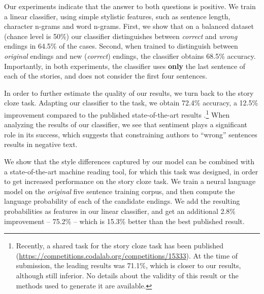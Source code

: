 \documentclass[11pt,a4paper]{article}
\newcommand{\com}[1]{}
\begin{document}
Our experiments indicate that the answer to both questions is positive. 
We train a linear classifier, using simple stylistic features, such as sentence length, character n-grams and word n-grams. 
First, we show that on a balanced dataset (chance level is 50\%) our classifier distinguishes between {\it correct} and {\it wrong} endings in 64.5\% of the cases. 
Second, when trained to distinguish between {\it original} endings and new ({\it correct}) endings, the classifier obtains 68.5\% accuracy. 
Importantly, in both experiments, the classifier uses {\bf only} the last sentence of each of the stories, and does not consider the first four sentences.


In order to further estimate the quality of our results, we turn back to the story cloze task.
Adapting our classifier to the task, we obtain 72.4\% accuracy, a 12.5\% improvement compared to the published state-of-the-art results \cite{Salle:2016}.\footnote{Recently, a shared task for the story cloze task has been published (\url{https://competitions.codalab.org/competitions/15333}). 
At the time of submission, the leading results was 71.1\%, which is  closer to our results, although still inferior.
No details about the validity of this result or the methods used to generate it are available.}
When analyzing the results of our classifier, we see that sentiment plays a significant role in its success,
which suggests that constraining authors to ``wrong'' sentences results in negative text.

We show that the style differences captured by our model can be combined with a state-of-the-art machine reading tool, for which this task was designed, in order to get increased performance on the story cloze task.  
We train a neural language model on the {\it original} five sentence training corpus, and then compute the language probability of each of the candidate endings. 
We add the resulting probabilities as features in our linear classifier, and get an additional 2.8\% improvement -- 75.2\% -- which is 15.3\% better than the best published result.

\com{Our results suggest that writing style is affected by the the writer's state of mind.
Writing a sentence intended to be {\it wrong} turns out quite differently than a sentence intended to be {\it correct}. 
Similarly, writing a sentence as part of the story is different from reading a story, and then writing the final sentence.}
\end{document}
